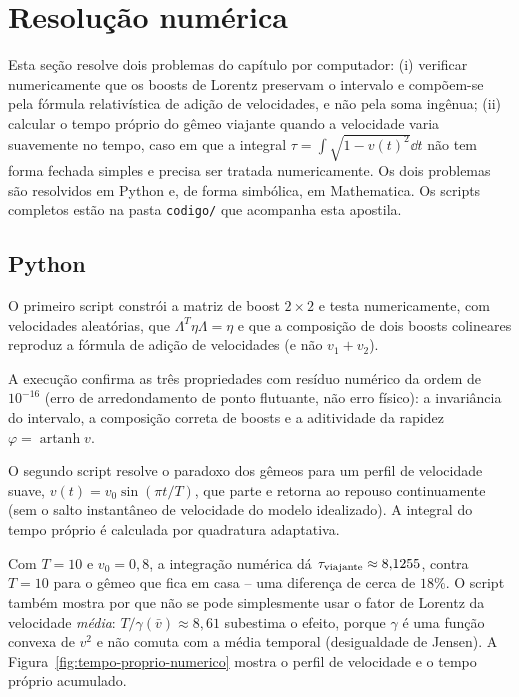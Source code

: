 \documentclass[12pt,a4paper,oneside]{book}
\theoremstyle{rgplain}
\theoremstyle{rgremark}
\begin{document}
\clearpage
\section{Resolução numérica}

Esta seção resolve dois problemas do capítulo por computador: (i) verificar
numericamente que os boosts de Lorentz preservam o intervalo e compõem-se
pela fórmula relativística de adição de velocidades, e não pela soma
ingênua; (ii) calcular o tempo próprio do gêmeo viajante quando a velocidade
varia suavemente no tempo, caso em que a integral $\tau=\int\sqrt{1-v(t)^2}\dd t$
não tem forma fechada simples e precisa ser tratada numericamente. Os dois
problemas são resolvidos em Python e, de forma simbólica, em Mathematica.
Os scripts completos estão na pasta \texttt{codigo/} que acompanha esta
apostila.

\subsection{Python}

O primeiro script constrói a matriz de boost $2\times2$ e testa
numericamente, com velocidades aleatórias, que $\Lambda^{T}\eta\Lambda=\eta$
e que a composição de dois boosts colineares reproduz a fórmula de adição de
velocidades (e não $v_1+v_2$).


A execução confirma as três propriedades com resíduo numérico da ordem de
$10^{-16}$ (erro de arredondamento de ponto flutuante, não erro físico):
a invariância do intervalo, a composição correta de boosts e a aditividade
da rapidez $\varphi=\operatorname{artanh}v$.

O segundo script resolve o paradoxo dos gêmeos para um perfil de velocidade
suave, $v(t)=v_0\sin(\pi t/T)$, que parte e retorna ao repouso continuamente
(sem o salto instantâneo de velocidade do modelo idealizado). A integral do
tempo próprio é calculada por quadratura adaptativa.


Com $T=10$ e $v_0=0{,}8$, a integração numérica dá
$\tau_{\rm viajante}\approx8{,}1255$, contra $T=10$ para o gêmeo que fica em
casa -- uma diferença de cerca de $18\%$. O script também mostra por que
não se pode simplesmente usar o fator de Lorentz da velocidade
\emph{média}: $T/\gamma(\bar v)\approx8{,}61$ subestima o efeito, porque
$\gamma$ é uma função convexa de $v^2$ e não comuta com a média temporal
(desigualdade de Jensen). A Figura~\ref{fig:tempo-proprio-numerico} mostra o
perfil de velocidade e o tempo próprio acumulado.
\end{document}
